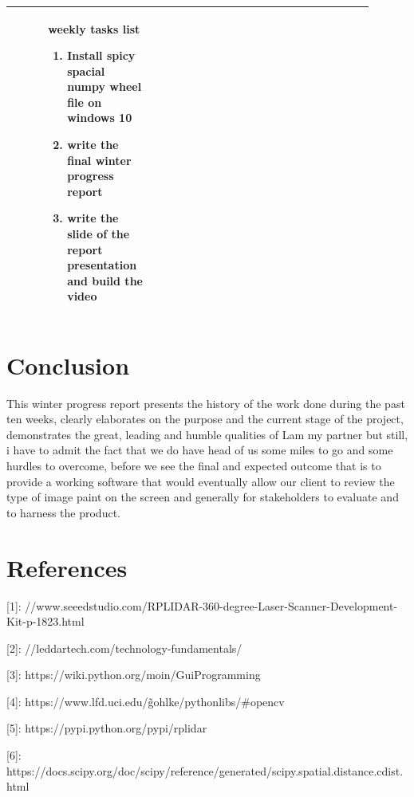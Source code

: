 \documentclass[10pt,draftclsnofoot,onecolumn,journal,compsoc]{IEEEtran}
\begin{document}
\begin{singlespace}
\begin{longtable}{|l|p{0.3\linewidth}|p{0.3\linewidth}|p{0.3\linewidth}|}
			&
			\textbf{ weekly tasks list}
	\begin{enumerate}
	\item  Install spicy spacial numpy wheel file on windows 10
	\item write the final winter progress report 
	\item write the slide of the report presentation and build the video
	\
	\end{enumerate}

			\\\hline
		\end{longtable}

	\section{Conclusion}	
	This winter progress report presents the history of the work done during the past ten weeks, clearly elaborates on the purpose and the current stage of the project, demonstrates the great, leading and humble qualities of Lam  my partner but still, i have to admit the fact that we do have head of us some miles to go and some hurdles to overcome,  before we see the final and expected  outcome that is to provide a working software that would eventually allow our client to review the type of image paint on the screen  and generally for stakeholders to evaluate and to harness the product.  
		
		
\end{singlespace}



\section{References}
[1]: {//www.seeedstudio.com/RPLIDAR-360-degree-Laser-Scanner-Development-Kit-p-1823.html}\par

[2]: {//leddartech.com/technology-fundamentals/}\par

[3]: {https://wiki.python.org/moin/GuiProgramming} \par

[4]: {https://www.lfd.uci.edu/\~gohlke/pythonlibs/\#opencv}

[5]: {https://pypi.python.org/pypi/rplidar}

[6]: {https://docs.scipy.org/doc/scipy/reference/generated/scipy.spatial.distance.cdist.html}
\end{document}
